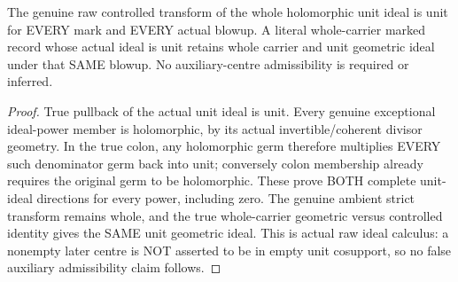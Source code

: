 \begin{theorem}
\label{hir:original-whole-unit-raw-geometric-transform-persistence}
\leanok
{}
The genuine raw controlled transform of the whole holomorphic unit ideal is
unit for EVERY mark and EVERY actual blowup. A literal whole-carrier marked
record whose actual ideal is unit retains whole carrier and unit geometric
ideal under that SAME blowup. No auxiliary-centre admissibility is required
or inferred.
\end{theorem}
\begin{proof}
True pullback of the actual unit ideal is unit. Every genuine exceptional
ideal-power member is holomorphic, by its actual invertible/coherent divisor
geometry. In the true colon, any holomorphic germ therefore multiplies EVERY
such denominator germ back into unit; conversely colon membership already
requires the original germ to be holomorphic. These prove BOTH complete
unit-ideal directions for every power, including zero. The genuine ambient
strict transform remains whole, and the true whole-carrier geometric versus
controlled identity gives the SAME unit geometric ideal. This is actual raw
ideal calculus: a nonempty later centre is NOT asserted to be in empty unit
cosupport, so no false auxiliary admissibility claim follows.
\end{proof}


